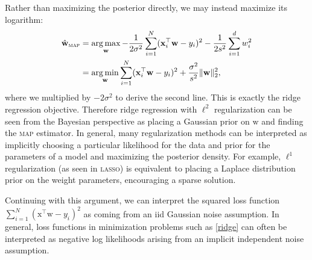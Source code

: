 \documentclass{article}
\newcommand{\acro}[1]{\textsc{\MakeLowercase{#1}}}
\newcommand{\trans}{^\top}
\renewcommand{\vec}[1]{\bm{\mathrm{#1}}}
\DeclareMathOperator*{\argmin}{arg\,min}
\DeclareMathOperator*{\argmax}{arg\,max}
\begin{document}
Rather than maximizing the posterior directly, we may instead maximize
its logarithm:
\begin{align*}
  \hat{\vec{w}}_{\text{\acro{MAP}}}
  &=
  \argmax_{\vec{w}}
  -\frac{1}{2\sigma^2}
  \sum_{i = 1}^N
  (\vec{x}_i\trans \vec{w} - y_i)^2
  -
  \frac{1}{2s^2}
  \sum_{i = 1}^d
  w_i^2
  \\
  &=
  \argmin_{\vec{w}}
  \sum_{i = 1}^N
  (\vec{x}_i\trans \vec{w} - y_i)^2
  +
  \frac{\sigma^2}{s^2}
  \lVert \vec{w} \rVert_{2}^{2},
\end{align*}
where we multiplied by $-2\sigma^2$ to derive the second line.  This
is exactly the ridge regression objective.  Therefore ridge regression
with $\ell^2$ regularization can be seen from the Bayesian perspective
as placing a Gaussian prior on $\vec{w}$ and finding the \acro{MAP}
estimator.  In general, many regularization methods can be interpreted
as implicitly choosing a particular likelihood for the data and prior
for the parameters of a model and maximizing the posterior density.
For example, $\ell^1$ regularization (as seen in \acro{LASSO}) is
equivalent to placing a Laplace distribution prior on the weight
parameters, encouraging a sparse solution.

Continuing with this argument, we can interpret the squared loss
function $\sum_{i=1}^N (\vec{x}\trans \vec{w} - y_i)^2$ as coming from
an iid Gaussian noise assumption.  In general, loss functions in
minimization problems such as \eqref{ridge} can often be interpreted
as negative log likelihoods arising from an implicit independent noise
assumption.
\end{document}
